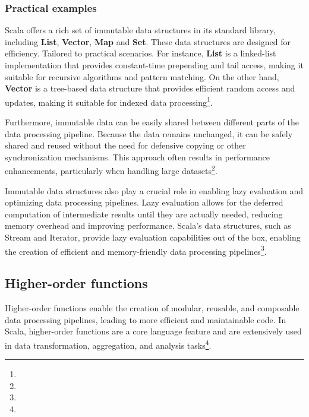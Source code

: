 \subsubsection{Practical examples}

Scala offers a rich set of immutable data structures in its standard library, including \textbf{List}, \textbf{Vector}, \textbf{Map} and \textbf{Set}. These data structures are designed for efficiency. Tailored to practical scenarios. For instance, \textbf{List} is a linked-list implementation that provides constant-time prepending and tail access, making it suitable for recursive algorithms and pattern matching. On the other hand, \textbf{Vector} is a tree-based data structure that provides efficient random access and updates, making it suitable for indexed data processing\footnote[9]{}.



Furthermore, immutable data can be easily shared between different parts of the data processing pipeline. Because the data remains unchanged, it can be safely shared and reused without the need for defensive copying or other synchronization mechanisms. This approach often results in performance enhancements, particularly when handling large datasets\footnote[10]{}.



Immutable data structures also play a crucial role in enabling lazy evaluation and optimizing data processing pipelines. Lazy evaluation allows for the deferred computation of intermediate results until they are actually needed, reducing memory overhead and improving performance. Scala's data structures, such as Stream and Iterator, provide lazy evaluation capabilities out of the box, enabling the creation of efficient and memory-friendly data processing pipelines\footnote[10]{}.



\subsection{Higher-order functions}

Higher-order functions enable the creation of modular, reusable, and composable data processing pipelines, leading to more efficient and maintainable code. In Scala, higher-order functions are a core language feature and are extensively used in data transformation, aggregation, and analysis tasks\footnote[11]{}.

